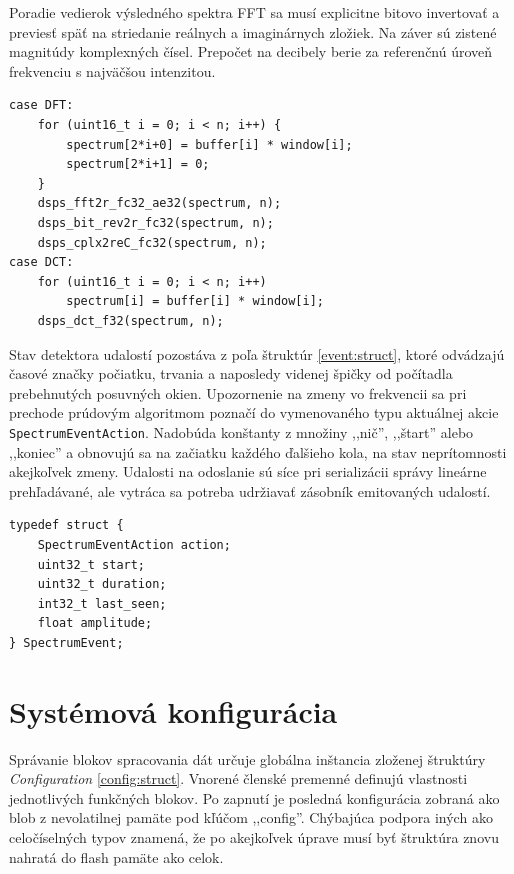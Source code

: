 Poradie vedierok výsledného spektra FFT sa musí explicitne bitovo invertovať a previesť späť na striedanie
reálnych a imaginárnych zložiek. Na záver sú zistené magnitúdy komplexných čísel.
Prepočet na decibely berie za referenčnú úroveň frekvenciu s najväčšou intenzitou.

\begin{lstlisting}[style=cstyle,label={fft},caption=Fourierová a kosínusová transformácia s ESP DSP knižnicou]
case DFT:
	for (uint16_t i = 0; i < n; i++) {
		spectrum[2*i+0] = buffer[i] * window[i];
		spectrum[2*i+1] = 0;
	}
	dsps_fft2r_fc32_ae32(spectrum, n);
	dsps_bit_rev2r_fc32(spectrum, n);
	dsps_cplx2reC_fc32(spectrum, n);
case DCT:
	for (uint16_t i = 0; i < n; i++)
    	spectrum[i] = buffer[i] * window[i];
    dsps_dct_f32(spectrum, n);
\end{lstlisting}

Stav detektora udalostí pozostáva z poľa štruktúr \ref{event:struct}, ktoré odvádzajú časové značky
počiatku, trvania a naposledy videnej špičky od počítadla prebehnutých posuvných okien. Upozornenie na
zmeny vo frekvencii sa pri prechode prúdovým algoritmom poznačí do vymenovaného typu
aktuálnej akcie \verb|SpectrumEventAction|. Nadobúda konštanty z množiny ,,nič'', ,,štart'' alebo ,,koniec'' a
obnovujú sa na začiatku každého ďalšieho kola, na stav neprítomnosti akejkoľvek zmeny. Udalosti na odoslanie
sú síce pri serializácii správy lineárne prehľadávané, ale vytráca sa potreba udržiavať zásobník emitovaných udalostí.

\begin{lstlisting}[style=cstyle,label={event:struct},
caption={Štruktúra udalosti frekvenčného vedierka},morekeywords={SpectrumEvent}]
typedef struct {
    SpectrumEventAction action;
    uint32_t start;
    uint32_t duration;
    int32_t last_seen;
    float amplitude;
} SpectrumEvent;
\end{lstlisting}

\section{Systémová konfigurácia}
Správanie blokov spracovania dát určuje globálna inštancia zloženej štruktúry \emph{Configuration} \ref{config:struct}.
Vnorené členské premenné definujú vlastnosti jednotlivých funkčných blokov. Po zapnutí je posledná
konfigurácia zobraná ako blob z nevolatilnej pamäte pod kľúčom ,,config''. Chýbajúca podpora iných ako celočíselných
typov znamená, že po akejkoľvek úprave musí byť štruktúra znovu nahratá do flash pamäte ako celok.

